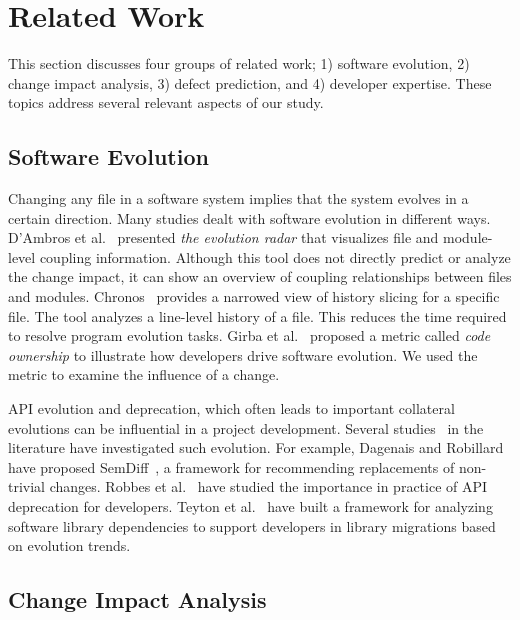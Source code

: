 \section{Related Work}
\label{sec:related}

This section discusses four groups of related work; 1) software evolution, 2)
change impact analysis, 3) defect prediction, and 4) developer expertise. These
topics address several relevant aspects of our study.

\subsection{Software Evolution}
Changing any file in a software system implies that the system evolves in a
certain direction. Many studies dealt with software evolution in different ways.
D'Ambros et al.~\cite{dambros_evolution_2006} presented \emph{the evolution
radar} that visualizes file and module-level coupling information. Although this
tool does not directly predict or analyze the change impact, it can show an
overview of coupling relationships between files and modules.
Chronos~\cite{servant_history_2012} provides a narrowed view of history
slicing for a specific file. The tool analyzes a line-level history of a file.
This reduces the time required to resolve program evolution tasks. Girba et
al.~\cite{girba_how_2005} proposed a metric called \emph{code ownership} to
illustrate how developers drive software evolution. We used the metric to
examine the influence of a change.

API evolution and deprecation, which often leads to important collateral evolutions
can be influential in a project development. Several studies~\cite{Dagenais:2009:SAR:1555001.1555083,
robbes_how_2012,sawant_reaction_2016,Teyton:2014:SLM:2926316.2926322,Kim:2010:MAI:1831508.1831654,Dagenais:2011:RAC:2000799.2000805,6062100} in the literature have
investigated such evolution. For example, Dagenais and Robillard have proposed SemDiff~\cite{Dagenais:2009:SAR:1555001.1555083},
a framework for recommending replacements of non-trivial changes. Robbes et al.~\cite{robbes_how_2012}
have studied the importance in practice of API deprecation for developers. Teyton et al.~\cite{Teyton:2014:SLM:2926316.2926322} have built a framework for analyzing software library dependencies to support developers in library migrations based on evolution trends.



\subsection{Change Impact Analysis}


